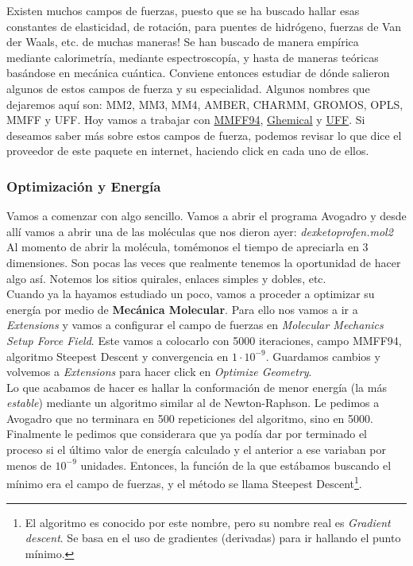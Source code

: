 \documentclass[10pt,letterpaper]{article}
\begin{document}
Existen muchos campos de fuerzas, puesto que se ha buscado hallar esas constantes de elasticidad, de rotaci\'on, para puentes de hidr\'ogeno, fuerzas de Van der Waals, etc. de muchas maneras! Se han buscado de manera emp\'irica mediante calorimetr\'ia, mediante espectroscop\'ia, y hasta de maneras te\'oricas bas\'andose en mec\'anica cu\'antica. Conviene entonces estudiar de d\'onde salieron algunos de estos campos de fuerza y su especialidad. Algunos nombres que dejaremos aqu\'i son: MM2, MM3, MM4, AMBER, CHARMM, GROMOS, OPLS, MMFF y UFF. Hoy vamos a trabajar con \href{http://open-babel.readthedocs.org/en/latest/Forcefields/mmff94.html}{MMFF94}, \href{http://open-babel.readthedocs.org/en/latest/Forcefields/ghemical.html}{Ghemical} y \href{http://open-babel.readthedocs.org/en/latest/Forcefields/uff.html}{UFF}. Si deseamos saber m\'as sobre estos campos de fuerza, podemos revisar lo que dice el proveedor de este paquete en internet, haciendo click en cada uno de ellos.

\subsubsection{Optimizaci\'on y Energ\'ia}
Vamos a comenzar con algo sencillo. Vamos a abrir el programa Avogadro y desde all\'i vamos a abrir una de las mol\'eculas que nos dieron ayer: \textit{dexketoprofen.mol2} Al momento de abrir la mol\'ecula, tom\'emonos el tiempo de apreciarla en 3 dimensiones. Son pocas las veces que realmente tenemos la oportunidad de hacer algo as\'i. Notemos los sitios quirales, enlaces simples y dobles, etc.\\

Cuando ya la hayamos estudiado un poco, vamos a proceder a optimizar su energ\'ia por medio de \textbf{Mec\'anica Molecular}.  Para ello nos vamos a ir a \emph{Extensions} y vamos a configurar el campo de fuerzas en \emph{Molecular Mechanics} \emph{Setup Force Field}. Este vamos a colocarlo con 5000 iteraciones, campo MMFF94, algoritmo Steepest Descent y convergencia en $1 \cdot 10^{-9}$. Guardamos cambios y volvemos a \emph{Extensions} para hacer click en \emph{Optimize Geometry}.\\

Lo que acabamos de hacer es hallar la conformaci\'on de menor energ\'ia (la m\'as \emph{estable}) mediante un algoritmo similar al de Newton-Raphson. Le pedimos a Avogadro que no terminara en 500 repeticiones del algoritmo, sino en 5000. Finalmente le pedimos que considerara que ya pod\'ia dar por terminado el proceso si el \'ultimo valor de energ\'ia calculado y el anterior a ese variaban por menos de $10^{-9}$ unidades. Entonces, la funci\'on de la que est\'abamos buscando el m\'inimo era el campo de fuerzas, y el m\'etodo se llama Steepest Descent\footnote{El algoritmo es conocido por este nombre, pero su nombre real es \emph{Gradient descent}. Se basa en el uso de gradientes (derivadas) para ir hallando el punto m\'inimo.}.\\
\end{document}
